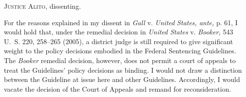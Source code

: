 
\setcounter{page}{116}

  \textsc{Justice Alito,} dissenting.

  For the reasons explained in my dissent in \emph{Gall} v. \emph{United}
\emph{States, ante,} p. 61, I would hold that, under the remedial
decision in \emph{United States} v. \emph{Booker,} 543 U.~S. 220, 258--265
(2005), a district judge is still required to give significant weight
to the policy decisions embodied in the Federal Sentencing Guidelines.
The \emph{Booker} remedial decision, however, does not permit a court of
appeals to treat the Guidelines' policy decisions as binding. I would
not draw a distinction between the Guideline at issue here and other
Guidelines. Accordingly, I would vacate the decision of the Court of
Appeals and remand for reconsideration.
